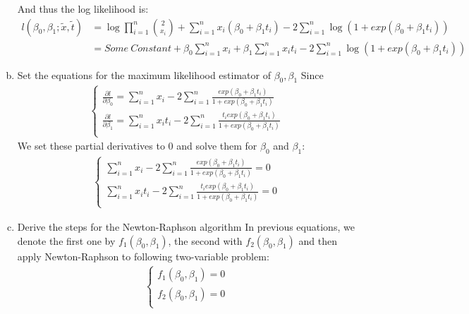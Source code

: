 \documentclass[12pt]{article}
\begin{document}
\begin{enumerate}[(a)]
And thus the log likelihood is:
\begin{align*}
l(\beta_0, \beta_1  ; \tilde x, \tilde t) &= \log \prod_{i=1}^n {2 \choose x_i} +  \sum_{i=1}^n x_i (\beta_0 + \beta_1 t_i) - 2 \sum_{i=1}^n \log (1 + exp(\beta_0 + \beta_1 t_i) ) \\
&= Some \ Constant +  \beta_0 \sum_{i=1}^n x_i   + \beta_1 \sum_{i=1}^n x_i t_i - 2  \sum_{i=1}^n \log (1 + exp(\beta_0 + \beta_1 t_i) )
\end{align*}
\item  Set the equations for the maximum likelihood estimator of $\beta_0, \beta_1$
Since
\begin{align*}
    \begin{cases} 
         \frac {\partial l} {\partial \beta_0} = \sum_{i=1}^n x_i - 2 \sum_{i=1}^n \frac{ exp(\beta_0 + \beta_1 t_i) } {1 + exp(\beta_0 + \beta_1 t_i) }\\
         \frac {\partial l} {\partial \beta_1} = \sum_{i=1}^n x_i t_i - 2 \sum_{i=1}^n \frac{ t_i exp(\beta_0 + \beta_1 t_i) } {1 + exp(\beta_0 + \beta_1 t_i) }\\
    \end{cases}
\end{align*}
We set these partial derivatives to 0 and solve them for $\beta_0$ and $\beta_1$:
\begin{align*}
    \begin{cases} 
         \sum_{i=1}^n x_i - 2 \sum_{i=1}^n \frac{ exp(\beta_0 + \beta_1 t_i) } {1 + exp(\beta_0 + \beta_1 t_i) } = 0\\
         \sum_{i=1}^n x_i t_i - 2 \sum_{i=1}^n \frac{ t_i exp(\beta_0 + \beta_1 t_i) } {1 + exp(\beta_0 + \beta_1 t_i) } = 0\\
    \end{cases}
\end{align*}
\item  Derive the steps for the Newton-Raphson algorithm
In previous equations, we denote the first one by $f_1(\beta_0, \beta_1)$, the second with $f_2(\beta_0, \beta_1)$ and then apply Newton-Raphson to following two-variable problem:
\begin{align*}
    \begin{cases} 
         f_1(\beta_0, \beta_1) = 0\\
         f_2(\beta_0, \beta_1) =  0\\
    \end{cases}
\end{align*}


\end{enumerate}
\end{document}
